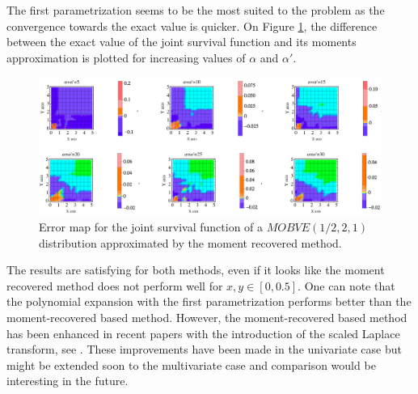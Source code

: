 The first parametrization seems to be the most suited to the problem as the convergence towards the exact value is quicker. On Figure \ref{MOBVESurvivalMnats}, the difference between the exact value of the joint survival function and its moments approximation is plotted for increasing values of $\alpha$ and $\alpha'$.  
\begin{center}
	\begin{figure}[h!]
		\begin{center}
			\includegraphics[width=16cm]{Chapitre5/GraphMOBVESurvivalMnats.png}
			\caption{Error map for the joint survival function of a $MOBVE(1/2,2,1)$ distribution approximated by the moment recovered method.}\label{MOBVESurvivalMnats}
		\end{center}
	\end{figure}
\end{center} 
The results are satisfying for both methods, even if it looks like the moment recovered method does not perform well for $x,y\in\left[0,0.5\right]$. One can note that the polynomial expansion with the first parametrization performs better than the moment-recovered based method. However, the moment-recovered based method has been enhanced in recent papers with the introduction of the scaled Laplace transform, see \citet{MnSa13,MnSaHa14}. These improvements have been made in the univariate case but might be extended soon to the multivariate case and comparison would be interesting in the future.  

